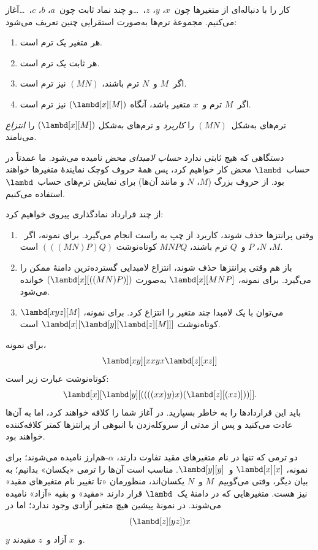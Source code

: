 \documentclass[../../../include/open-logic-section]{subfiles}
\begin{document}

کار را با دنباله‌ای از متغیرها چون~$x$، $y$، $z$،~\dots و چند نماد ثابت
چون~$a$، $b$، $c$،~\dots آغاز می‌کنیم. مجموعهٔ ترم‌ها به‌صورت استقرایی
چنین تعریف می‌شود:
\begin{enumerate}
\item هر متغیر یک ترم است.
\item هر ثابت یک ترم است.
\item اگر~$M$ و~$N$ ترم باشند، $(MN)$ نیز ترم است.
\item اگر~$M$ ترم و~$x$ متغیر باشد، آنگاه
  $(\lambd[x][M])$ نیز ترم است.
\end{enumerate}
ترم‌های به‌شکل~$(MN)$ را \emph{کاربرد} و ترم‌های به‌شکل
$(\lambd[x][M])$ را \emph{انتزاع} می‌نامند.

دستگاهی که هیچ ثابتی ندارد \emph{حساب لامبدای محض} نامیده می‌شود. ما
عمدتاً در حساب~$\lambd$ محض کار خواهیم کرد، پس همهٔ حروف کوچک نمایندهٔ
متغیرها خواهند بود. از حروف بزرگ ($M$، $N$ و مانند آن‌ها) برای نمایش
ترم‌های حساب~$\lambd$ استفاده می‌کنیم.

از چند قرارداد نمادگذاری پیروی خواهیم کرد:

\begin{conv}
\begin{enumerate}
\item وقتی پرانتزها حذف شوند، کاربرد از چپ به راست انجام می‌گیرد. برای
  نمونه، اگر~$M$، $N$، $P$ و~$Q$ ترم باشند، $MNPQ$ کوتاه‌نوشت
  $(((MN)P)Q)$ است.
\item باز هم وقتی پرانتزها حذف شوند، انتزاع لامبدایی گسترده‌ترین دامنهٔ
  ممکن را می‌گیرد. برای نمونه، $\lambd[x][MNP]$ به‌صورت
  $(\lambd[x][((MN)P)])$ خوانده می‌شود.
\item می‌توان با یک لامبدا چند متغیر را انتزاع کرد. برای نمونه،
  $\lambd[xyz][M]$ کوتاه‌نوشت
  $\lambd[x][\lambd[y][\lambd[z][M]]]$ است.
\end{enumerate}
\end{conv}

برای نمونه،
\[
\lambd[xy][xxyx \lambd[z][xz]]
\]
کوتاه‌نوشت عبارت زیر است:
\[
\lambd[x][\lambd[y][((((xx)y)x)(\lambd[z][(xz)]))]].
\]
باید این قراردادها را به خاطر بسپارید. در آغاز شما را کلافه خواهند کرد،
اما به آن‌ها عادت می‌کنید و پس از مدتی از سروکله‌زدن با انبوهی از
پرانتزها کمتر کلافه‌کننده خواهند بود.

دو ترمی که تنها در نام متغیرهای مقید تفاوت دارند، $\alpha$-هم‌ارز
نامیده می‌شوند؛ برای نمونه، $\lambd[x][x]$ و~$\lambd[y][y]$. مناسب است
آن‌ها را ترمی «یکسان» بدانیم؛ به بیان دیگر، وقتی می‌گوییم~$M$ و~$N$
یکسان‌اند، منظورمان «تا تغییر نام متغیرهای مقید» نیز هست. متغیرهایی که
در دامنهٔ یک~$\lambd$ قرار دارند «مقید» و بقیه «آزاد» نامیده می‌شوند.
در نمونهٔ پیشین هیچ متغیر آزادی وجود ندارد؛ اما در
\[
(\lambd[z][yz])x
\]
$y$ و~$x$ آزاد و~$z$ مقیدند.
\end{document}
